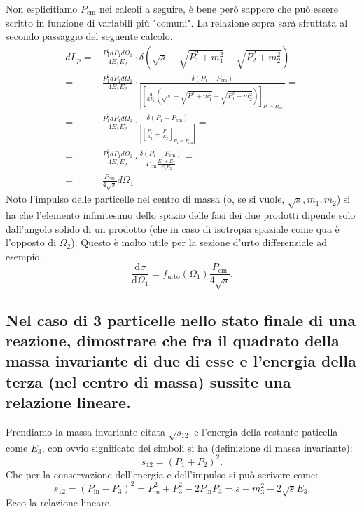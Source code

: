 Non esplicitiamo $P_{\text{cm}}$ nei calcoli a seguire, è bene però sappere che può essere scritto in funzione di variabili più "comuni". La relazione sopra sarà sfruttata al secondo passaggio del seguente calcolo.
\begin{align*}
	dL_p =& \frac{P_1^2 dP_1 d \Omega_1}{4E_1E_2} \cdot \delta\left( \sqrt{s} - \sqrt{P_1^2 + m_1^2} - \sqrt{P_2^2 + m_2^2}  \right) \\
	=& \frac{P_1^2 dP_1 d \Omega_1}{4E_1E_2} \cdot 
	\frac{\delta\left(P_1-P_{\text{cm}}\right)}{\left|\left[\frac{\mbox{d}}{\mbox{d}P_1}\left(\sqrt{s}-\sqrt{P_1^2+m_1^2}-\sqrt{P_1^2+m_2^2}\right)\right]_{P_1=P_{\text{cm}}}\right|} = \\
	=& \frac{P_1^2 dP_1 d \Omega_1}{4E_1E_2} \cdot \frac{ \delta \left( P_1-P_{\text{cm}} \right) }{ \left| \left[ \frac{P_1}{E_1}+\frac{P_1}{E_2} \right]_{P_1=P_{\text{cm}}} \right|}=\\
	=& \frac{P_1^2 dP_1 d \Omega_1}{4E_1E_2} \cdot \frac{\delta\left(P_1-P_{\text{cm}}\right)}{P_{\text{cm}} \frac{E_1 + E_2}{E_1E_2}} = \\
	=& \frac{P_{\text{cm}} }{4\sqrt{s}} d\Omega_{1}
\end{align*}
Noto l'impulso delle particelle nel centro di massa (o, se si vuole, $\sqrt{s}, m_1, m_2$) si ha che l'elemento infinitesimo dello spazio delle fasi dei due prodotti dipende solo dall'angolo solido di un prodotto (che in caso di isotropia spaziale come qua è l'opposto di $\Omega_2$). Questo è molto utile per la sezione d'urto differenziale ad esempio.
\[
	\frac{\mbox{d} \sigma}{\mbox{d} \Omega_1} = f_{\text{urto}}\left( \Omega_1 \right) \frac{P_{\text{cm}}}{4\sqrt{s} }
.\] 

\subsection[]{Nel caso di 3 particelle nello stato finale di una reazione, dimostrare che fra il quadrato della massa invariante di due di esse e l'energia della terza (nel centro di massa) sussite una relazione lineare.}
Prendiamo la massa invariante citata $\sqrt{s_{12}}$ e l'energia della restante paticella come $E_3$, con ovvio significato dei simboli si ha (definizione di massa invariante):
\[
	s_{12} = \left( P_1 + P_2 \right)^2
.\] 
Che per la conservazione dell'energia e dell'impulso si può scrivere come:
\[
	s_{12} = \left( P_{\text{in}} - P_3 \right)^2 = P_{\text{in}}^2 + P_3^2 - 2 P_{\text{in}}P_3 =s + m_3^2 - 2 \sqrt{s}E_3 
.\] 
Ecco la relazione lineare.

